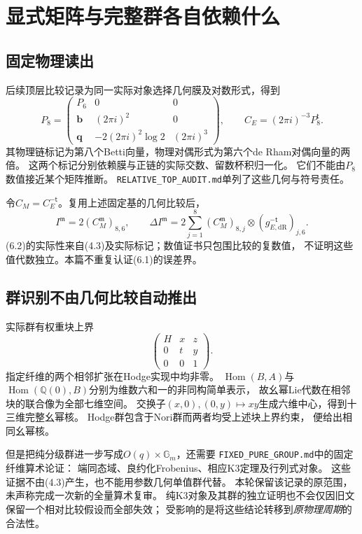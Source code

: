\documentclass[11pt,a4paper]{ctexart}
\theoremstyle{cnplain}\newtheorem{theorem}{定理}[section]
\theoremstyle{remark}\newtheorem{remark}[theorem]{注}
\newcommand{\Q}{\mathbb Q}\newcommand{\C}{\mathbb C}\newcommand{\Z}{\mathbb Z}
\newcommand{\Gm}{\mathbb G_m}\newcommand{\PP}{\mathbb P}
\newcommand{\dR}{\mathrm{dR}}\newcommand{\B}{\mathrm B}
\newcommand{\Hom}{\operatorname{Hom}}\newcommand{\Res}{\operatorname{Res}}
\newcommand{\mot}{\mathfrak m}
\begin{document}
\section{显式矩阵与完整群各自依赖什么}
\subsection{固定物理读出}
后续顶层比较记录\cite{Top}为同一实际对象选择几何膜及对数形式，得到
\[
 P_8=
 \begin{pmatrix}
 P_6&0&0\\
 \boldsymbol b&(2\pi i)^2&0\\
 \boldsymbol q&-2(2\pi i)^2\log2&(2\pi i)^3
 \end{pmatrix},\qquad
 C_E=(2\pi i)^{-3}P_8^{\mathsf t}.
                                                               \tag{6.1}
\]
其物理链标记为第八个Betti向量，物理对偶形式为第六个de Rham对偶向量的两倍。
这两个标记分别依赖膜与正链的实际交数、留数杯积归一化。
它们不能由$P_8$数值接近某个矩阵推断。
\texttt{RELATIVE\_TOP\_AUDIT.md}单列了这些几何与符号责任。

令$C_M=C_E^{-\mathsf t}$。复用上述固定基的几何比较后，
\[
 I^\mot=2(C_M^\mot)_{8,6},\qquad
 \Delta I^\mot=
 2\sum_{j=1}^{8}(C_M^\mot)_{8,j}\otimes(g_{E,\dR}^{-\mathsf t})_{j,6}.
                                                               \tag{6.2}
\]
(6.2)的实际性来自(4.3)及实际标记；数值证书只包围比较的复数值，
不证明这些值代数独立。本篇不重复认证(6.1)的误差界。

\subsection{群识别不由几何比较自动推出}
实际群有权重块上界
\[
 \begin{pmatrix}H&x&z\\0&t&y\\0&0&1\end{pmatrix}.
\]
指定纤维的两个相邻扩张在Hodge实现中均非零。
$\Hom(B,A)$与$\Hom(\Q(0),B)$分别为维数六和一的非同构简单表示，
故幺幂Lie代数在相邻块的联合像为全部七维空间。
交换子$(x,0),(0,y)\mapsto xy$生成六维中心，得到十三维完整幺幂核。
Hodge群包含于Nori群而两者均受上述块上界约束，
便给出相同幺幂核\cite{Mixed}。

但是把纯分级群进一步写成$O(q)\times\Gm$，还需要
\texttt{FIXED\_PURE\_GROUP.md}中的固定纤维算术论证：
端同态域、良约化Frobenius、相应K3定理及行列式对象。
这些证据不由(4.3)产生，也不能用参数几何单值群代替。
本轮保留该记录的原范围，未声称完成一次新的全量算术复审。
纯K3对象及其群的独立证明也不会仅因旧文保留一个相对比较假设而全部失效；
受影响的是将这些结论转移到\emph{原物理周期}的合法性。
\end{document}
